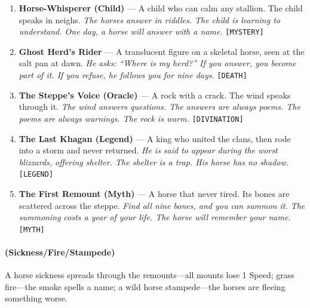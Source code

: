 \begin{enumerate}
\item \textbf{Horse-Whisperer (Child)} --- A child who can calm any stallion. The child speaks in neighs.
  \hfill \textit{The horses answer in riddles. The child is learning to understand. One day, a horse will answer with a name.} \texttt{[MYSTERY]}
\item[J] \textbf{Ghost Herd's Rider} --- A translucent figure on a skeletal horse, seen at the salt pan at dawn.
  \hfill \textit{He asks: ``Where is my herd?'' If you answer, you become part of it. If you refuse, he follows you for nine days.} \texttt{[DEATH]}
\item[Q] \textbf{The Steppe's Voice (Oracle)} --- A rock with a crack. The wind speaks through it.
  \hfill \textit{The wind answers questions. The answers are always poems. The poems are always warnings. The rock is warm.} \texttt{[DIVINATION]}
\item[K] \textbf{The Last Khagan (Legend)} --- A king who united the clans, then rode into a storm and never returned.
  \hfill \textit{He is said to appear during the worst blizzards, offering shelter. The shelter is a trap. His horse has no shadow.} \texttt{[LEGEND]}
\item[A] \textbf{The First Remount (Myth)} --- A horse that never tired. Its bones are scattered across the steppe.
  \hfill \textit{Find all nine bones, and you can summon it. The summoning costs a year of your life. The horse will remember your name.} \texttt{[MYTH]}
\end{enumerate}

\paragraph*{(Sickness/Fire/Stampede)} A horse sickness spreads through the remounts---all mounts lose 1 Speed; grass fire---the smoke spells a name; a wild horse stampede---the horses are fleeing something worse.


